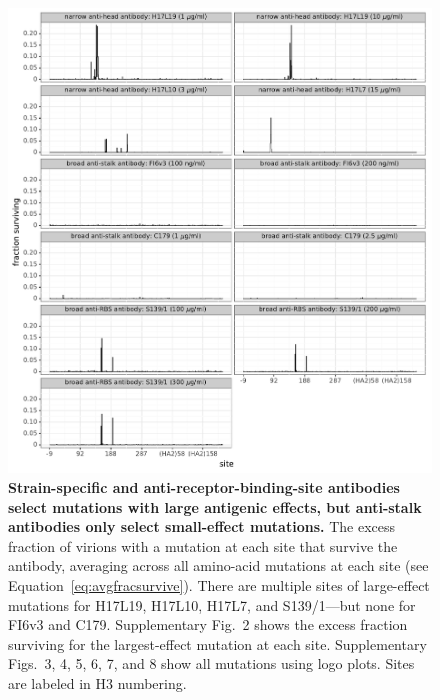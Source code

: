 \documentclass[11pt]{article}
\begin{document}
\begin{figure}
\centerline{\includegraphics[width=\textwidth]{Fig4.pdf}}
\caption{
\label{fig:avgfracsurvive}
{\bf Strain-specific and anti-receptor-binding-site antibodies select mutations with large antigenic effects, but anti-stalk antibodies only select small-effect mutations.}
The excess fraction of virions with a mutation at each site that survive the antibody, averaging across all amino-acid mutations at each site (see Equation~\ref{eq:avgfracsurvive}).
There are multiple sites of large-effect mutations for H17L19, H17L10, H17L7, and S139/1---but none for FI6v3 and C179.
Supplementary Fig.~2 shows the excess fraction surviving for the largest-effect mutation at each site.
Supplementary Figs.~3, 4, 5, 6, 7, and 8 show all mutations using logo plots.
Sites are labeled in H3 numbering.
}
\end{figure}

\clearpage
\end{document}
